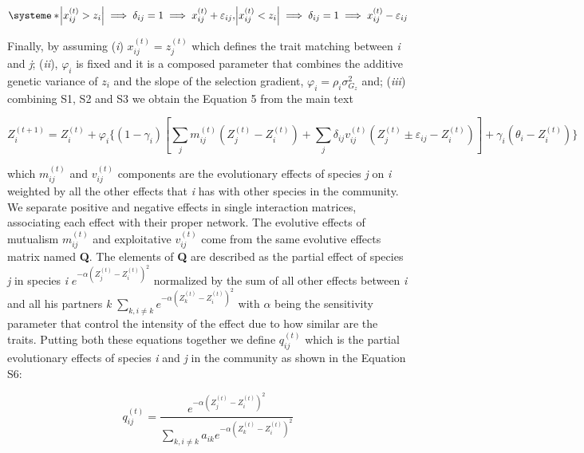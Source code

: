 \documentclass[a4paper, 12pt]{article}
\begin{document}
\begin{equation} \label{supeq:5}
    \systeme*{\abs{x^{(t)}_{ij} > z_{i}} \implies \delta_{ij} = 1 \implies x^{(t)}_{ij} + \varepsilon_{ij},\abs{x^{(t)}_{ij} < z_{i}} \implies \delta_{ij} = 1 \implies x^{(t)}_{ij} - \varepsilon_{ij}}
\end{equation}

Finally, by assuming (\textit{i}) $x^{(t)}_{ij} = z^{(t)}_{j}$ which defines the trait matching between \textit{i} and \textit{j}; (\textit{ii}), $\varphi_{i}$ is fixed and it is a composed parameter that combines the additive genetic variance of $z_{i}$ and the slope of the selection gradient, $\varphi_{i} = \rho_{i} \sigma^{2}_{G_z}$ and; (\textit{iii}) combining  S1, S2 and S3 we obtain the Equation 5 from the main text

\begin{equation} \tag{5}
  Z^{(t+1)}_{i} = Z^{(t)}_{i} + \varphi_{i}\{(1 - \gamma_{i})[\sum_{j} m^{(t)}_{ij}(Z^{(t)}_{j} - Z^{(t)}_{i}) + \sum_{j}\delta_{ij}v^{(t)}_{ij}(Z^{(t)}_{j} \pm \varepsilon_{ij} - Z^{(t)}_{i})] + \gamma_{i}(\theta_{i} - Z^{(t)}_{i})\}
\end{equation}

which $m^{(t)}_{ij}$ and $v^{(t)}_{ij}$ components are the evolutionary effects of species \textit{j} on \textit{i} weighted by all the other effects that \textit{i} has with other species in the community. We separate positive and negative effects in single interaction matrices, associating each effect with their proper network. The evolutive effects of mutualism $m^{(t)}_{ij}$ and exploitative $v^{(t)}_{ij}$ come from the same evolutive effects matrix named \textbf{Q}. The elements of \textbf{Q} are described as the partial effect of species \textit{j} in species \textit{i} $e^{-\alpha(Z^{(t)}_{j} - Z^{(t)}_{i})^2}$ normalized by the sum of all other effects between \textit{i} and all his partners \textit{k} $\sum_{k, i \neq k} e^{-\alpha(Z^{(t)}_{k} - Z^{(t)}_{i})^2}$  with $\alpha$ being the sensitivity parameter that control the intensity of the effect due to how similar are the traits. Putting both these equations together we define $q^{(t)}_{ij}$ which is the partial evolutionary effects of species \textit{i} and \textit{j} in the community as shown in the Equation S6:

\begin{equation} \label{supeq:6}
  q^{(t)}_{ij} = \frac{e^{-\alpha(Z^{(t)}_{j} - Z^{(t)}_{i})^2}}{\sum_{k, i \neq k} a_{ik} e^{-\alpha(Z^{(t)}_{k} - Z^{(t)}_{i})^2} }
\end{equation}
\end{document}

